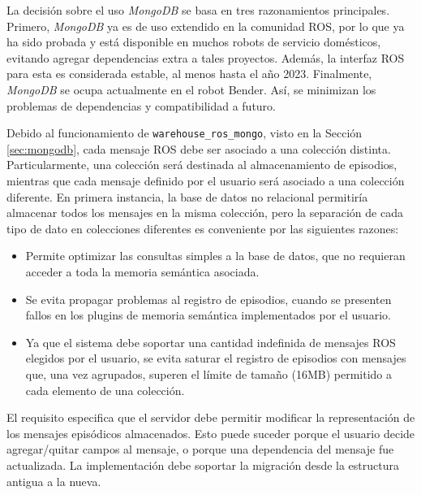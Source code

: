 La decisión sobre el uso \textit{MongoDB} se basa en tres razonamientos principales. Primero, \textit{MongoDB} ya es de uso extendido en la comunidad ROS, por lo que ya ha sido probada y está disponible en muchos robots de servicio domésticos, evitando agregar dependencias extra a tales proyectos. Además, la interfaz ROS para esta es considerada estable, al menos hasta el año 2023.  Finalmente, \textit{MongoDB} se ocupa actualmente en el robot Bender. Así, se minimizan los problemas de dependencias y compatibilidad a futuro.


Debido al funcionamiento de \texttt{warehouse\_ros\_mongo}, visto en la Sección \ref{sec:mongodb}, cada mensaje ROS debe ser asociado a una colección distinta. Particularmente, una colección será destinada al almacenamiento de episodios, mientras que cada mensaje definido por el usuario será asociado a una colección diferente. En primera instancia, la base de datos no relacional permitiría almacenar todos los mensajes en la misma colección, pero la separación de cada tipo de dato en colecciones diferentes es conveniente por las siguientes razones:
\begin{itemize}
\item Permite optimizar las consultas simples a la base de datos, que no requieran acceder a toda la memoria semántica asociada.
\item Se evita propagar problemas al registro de episodios, cuando se presenten fallos en los plugins de memoria semántica implementados por el usuario.
\item Ya que el sistema debe soportar una cantidad indefinida de mensajes ROS elegidos por el usuario, se evita saturar el registro de episodios con mensajes que, una vez agrupados, superen el límite de tamaño (16MB) permitido a cada elemento de una colección.
\end{itemize}

El requisito  especifica que el servidor debe permitir modificar la representación de los mensajes episódicos almacenados. Esto puede suceder porque el usuario decide agregar/quitar campos al mensaje, o porque una dependencia del mensaje fue actualizada. La implementación debe soportar la migración desde la estructura antigua a la nueva.

